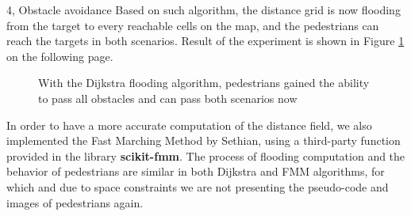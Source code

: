 \documentclass[10pt,a4paper]{article}
\begin{document}
\begin{task}{4, Obstacle avoidance}
Based on such algorithm, the distance grid is now flooding from the target to every reachable cells on the map, and the pedestrians can reach the targets in both scenarios. Result of the experiment is shown in Figure \ref{f43} on the following page.

\begin{figure} [!h]
 \centering
 \caption{With the Dijkstra flooding algorithm, pedestrians gained the ability to pass all obstacles and can pass both scenarios now}
 \label{f43}
\end{figure}

In order to have a more accurate computation of the distance field, we also implemented the Fast Marching Method by Sethian, using a third-party function provided in the library \textbf{scikit-fmm}. The process of flooding computation and the behavior of pedestrians are similar in both Dijkstra and FMM algorithms, for which and due to space constraints we are not presenting the pseudo-code and images of pedestrians again. 


\end{task}
\end{document}
